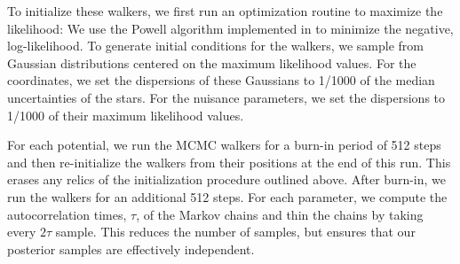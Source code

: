 \documentclass[numberedappendix]{emulateapj}
\begin{document}
To initialize these walkers, we first run an optimization routine to maximize the likelihood: We use the Powell algorithm implemented in  \citep{powell64, scipy} to minimize the negative, log-likelihood. To generate initial conditions for the walkers, we sample from Gaussian distributions centered on the maximum likelihood values. For the coordinates, we set the dispersions of these Gaussians to 1/1000 of the median uncertainties of the stars. For the nuisance parameters, we set the dispersions to 1/1000 of their maximum likelihood values. 

For each potential, we run the MCMC walkers for a burn-in period of 512 steps and then re-initialize the walkers from their positions at the end of this run. This erases any relics of the initialization procedure outlined above. After burn-in, we run the walkers for an additional 512 steps. For each parameter, we compute the autocorrelation times, $\tau$, of the Markov chains and thin the chains by taking every $2\tau$ sample. This reduces the number of samples, but ensures that our posterior samples are effectively independent. 
\end{document}
